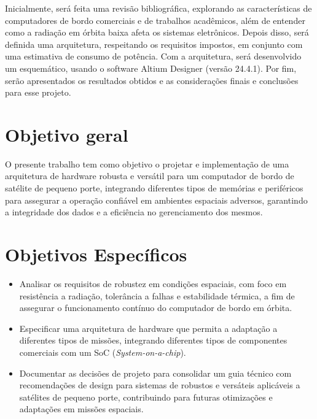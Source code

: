 Inicialmente, será feita uma revisão bibliográfica, explorando as características de computadores de bordo comerciais e de trabalhos acadêmicos, além de entender como a radiação em órbita baixa afeta os sistemas eletrônicos. Depois disso, será definida uma arquitetura, respeitando os requisitos impostos, em conjunto com uma estimativa de consumo de potência. Com a arquitetura, será desenvolvido um esquemático, usando o software Altium Designer (versão 24.4.1). Por fim, serão apresentados os resultados obtidos e as considerações finais e conclusões para esse projeto.

\section{Objetivo geral}

O presente trabalho tem como objetivo o projetar e implementação de uma arquitetura de hardware robusta e versátil para um computador de bordo de satélite de pequeno porte, integrando diferentes tipos de memórias e periféricos para assegurar a operação confiável em ambientes espaciais adversos, garantindo a integridade dos dados e a eficiência no gerenciamento dos mesmos.

\section{Objetivos Específicos}

\begin{itemize}
    \item Analisar os requisitos de robustez em condições espaciais, com foco em resistência a radiação, tolerância a falhas e estabilidade térmica, a fim de assegurar o funcionamento contínuo do computador de bordo em órbita.
    \item Especificar uma arquitetura de hardware que permita a adaptação a diferentes tipos de missões, integrando diferentes tipos de componentes comerciais com um SoC (\textit{System-on-a-chip}).
    \item  Documentar as decisões de projeto para consolidar um guia técnico com recomendações de design para sistemas de robustos e versáteis aplicáveis a satélites de pequeno porte, contribuindo para futuras otimizações e adaptações em missões espaciais.
\end{itemize}

